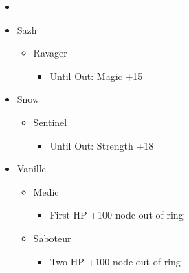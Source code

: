 \documentclass{report}
\begin{document}

\begin{menu}
\begin{itemize}
    \paradigm
    \begin{itemize}
        \item {}%
{\paradigmline{(\com)}{(\com)}{(\med)}}%
{\paradigmline{(\rav)}{\rav}{\rav}}%
{\paradigmline{\textit{\rav}}{\textit{(\rav)}}{\textit{(\sab)}}}%
{\paradigmline{\com}{\com}{\rav}}%
{\paradigmline{(\syn)}{(\rav)}{\sab}}%
{\paradigmline{\com}{\com}{\rav}}
    \end{itemize}
    \crystarium
    \begin{itemize}
        \item Sazh
        \begin{itemize}
            \item Ravager
            \begin{itemize}
                \item Until Out: Magic +15
            \end{itemize}
        \end{itemize}
        \item Snow
        \begin{itemize}
            \item Sentinel
            \begin{itemize}
                \item Until Out: Strength +18
            \end{itemize}
        \end{itemize}
        \item Vanille
        \begin{itemize}
            \item Medic
            \begin{itemize}
                \item First HP +100 node out of ring
            \end{itemize}
            \item Saboteur
            \begin{itemize}
                \item Two HP +100 node out of ring
            \end{itemize}
        \end{itemize}
    \end{itemize}
\end{itemize}
\end{menu}
\renewcommand{\first}{[1] Tireless Charge (\com/\com/\med)}
\renewcommand{\second}{[2] Tri-Disaster (\rav/\rav/\rav)}
\renewcommand{\third}{[3] Smart Bomb (\rav/\rav/\sab)}
\renewcommand{\fourth}{[4] Aggression (\com/\com/\rav)}
\renewcommand{\fifth}{[5] Geurilla (\syn/\rav/\sab)}
\renewcommand{\sixth}{[6] Aggression (\com/\com/\rav)}
\end{document}
